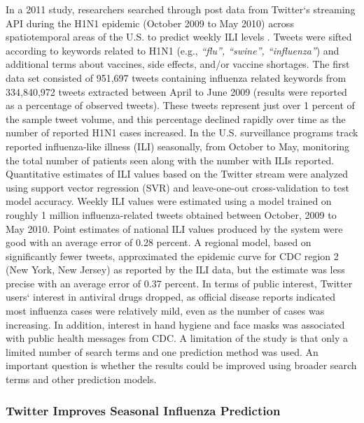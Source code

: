 \documentclass[sigconf]{acmart}
\begin{document}
In a 2011 study, researchers searched through post data from Twitter`s streaming API 
during the H1N1 epidemic (October 2009 to May 2010) across spatiotemporal areas of the 
U.S. to predict weekly ILI levels \cite{signorini11}. Tweets were sifted according to 
keywords related to H1N1 (e.g., {\it ``flu'', ``swine'', ``influenza''}) and additional 
terms about vaccines, side effects, and/or vaccine shortages. The first data set consisted 
of 951,697 tweets containing influenza related keywords from 334,840,972 tweets extracted 
between April to June 2009 (results were reported as a percentage of observed tweets). 
These tweets represent just over 1 percent of the sample tweet volume, and this percentage 
declined rapidly over time as the number of reported H1N1 cases increased. In the U.S. 
surveillance programs track reported influenza-like illness (ILI) seasonally, from October 
to May, monitoring the total number of patients seen along with the number with ILIs 
reported. Quantitative estimates of ILI values based on the Twitter stream were analyzed 
using support vector regression (SVR) and leave-one-out cross-validation to test model 
accuracy. Weekly ILI values were estimated using a model trained on roughly 1 million
influenza-related tweets obtained between October, 2009 to May 2010. Point estimates of 
national ILI values produced by the system were good with an average error of 0.28 percent. 
A regional model, based on significantly fewer tweets, approximated the epidemic curve for 
CDC region 2 (New York, New Jersey) as reported by the ILI data, but the estimate was less 
precise with an average error of 0.37 percent. In terms of public interest, Twitter users` 
interest in antiviral drugs dropped, as official disease reports indicated most 
influenza cases were relatively mild, even as the number of cases was increasing. In 
addition, interest in hand hygiene and face masks was associated with public health 
messages from CDC. A limitation of the study is that only a limited number of search 
terms and one prediction method was used. An important question is whether the results 
could be improved using broader search terms and other prediction models. 

\subsubsection{Twitter Improves Seasonal Influenza Prediction}
\end{document}
